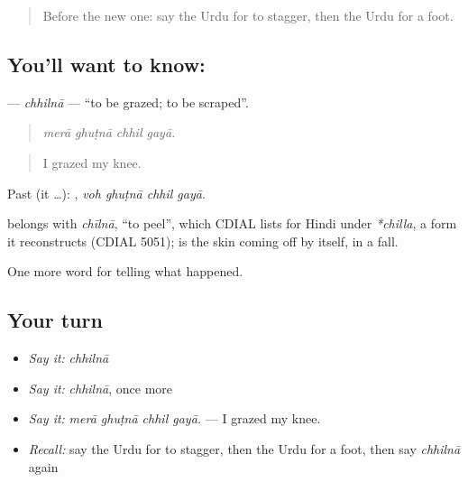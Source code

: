 \label{lesson:UR-C285-chhilna}



\begin{quote}
Before the new one: say the Urdu for to stagger, then the Urdu for a foot.
\end{quote}

\subsection*{You'll want to know: }
\textbf{} — \emph{chhilnā} — \textquotedblleft{}to be grazed; to be scraped\textquotedblright{}.

\begin{quote}
   
\end{quote}

\begin{quote}
\emph{merā ghuṭnā chhil gayā.}
\end{quote}

\begin{quote}
I grazed my knee.
\end{quote}

Past (it …):    , \emph{voh ghuṭnā chhil gayā}.

\begin{cousinweb}
belongs with \emph{chīlnā}, \textquotedblleft{}to peel\textquotedblright{}, which CDIAL lists for Hindi under \emph{*chilla}, a form it reconstructs (CDIAL 5051); \textbf{} is the skin coming off by itself, in a fall.
\end{cousinweb}

\begin{grammarlens}[title={What you've built}]
One more word for telling what happened.
\end{grammarlens}

\subsection*{Your turn}
\begin{itemize}
\raggedright
  \item \emph{Say it:} \emph{chhilnā}
  \item \emph{Say it:} \emph{chhilnā}, once more
  \item \emph{Say it:} \emph{merā ghuṭnā chhil gayā.} — I grazed my knee.
  \item \emph{Recall:} say the Urdu for to stagger, then the Urdu for a foot, then say \emph{chhilnā} again
\end{itemize}

